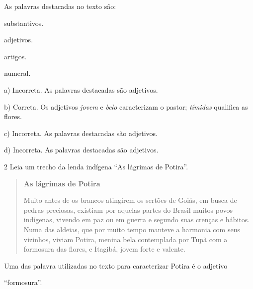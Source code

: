 \begin{escolha}
\begin{escolha}
\begin{escolha}
{As palavras destacadas no texto são:

\begin{escolha}
\item substantivos.

\item adjetivos.

\item artigos.

\item numeral.
\end{escolha}


a)  Incorreta. As palavras destacadas são adjetivos.

b)  Correta. Os adjetivos \textit{jovem} e \textit{belo} caracterizam o
pastor; \textit{tímidas} qualifica as flores.

c)  Incorreta. As palavras destacadas são adjetivos.

d)  Incorreta. As palavras destacadas são adjetivos.

\num{2} Leia um trecho da lenda indígena ``As lágrimas de Potira''.

\begin{quote}
\textbf{As lágrimas de Potira}

Muito antes de os brancos atingirem os sertões de Goiás, em busca de
pedras preciosas, existiam por aquelas partes do Brasil muitos povos
indígenas, vivendo em paz ou em guerra e segundo suas crenças e hábitos.
Numa das aldeias, que por muito tempo manteve a harmonia com seus
vizinhos, viviam Potira, menina bela contemplada por Tupã com a formosura das
flores, e Itagibá, jovem forte e valente. 
\end{quote}


Uma das palavra utilizadas no texto para caracterizar Potira é o adjetivo

\begin{escolha}
\item ``formosura''.


\end{escolha}}
\end{escolha}
\end{escolha}
\end{escolha}
